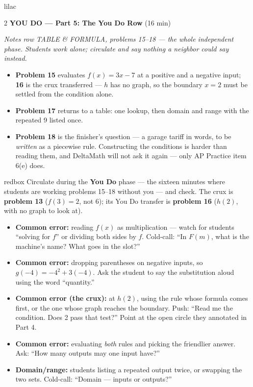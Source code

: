 \documentclass[10pt]{article}
\begin{document}
\begin{skillbox}{lilac}
\begin{multicols}{2}
\textbf{YOU DO --- Part 5: The You Do Row} (16 min)

\textit{Notes row TABLE \& FORMULA, problems 15--18 --- the whole independent
phase. Students work alone; circulate and say nothing a neighbor could say
instead.}
\begin{itemize}
  \item \textbf{Problem 15} evaluates $f(x) = 3x - 7$ at a positive and a negative
        input; \textbf{16} is the crux transferred --- $h$ has no graph, so the
        boundary $x = 2$ must be settled from the condition alone.
  \item \textbf{Problem 17} returns to a table: one lookup, then domain and range
        with the repeated 9 listed once.
  \item \textbf{Problem 18} is the finisher's question --- a garage tariff in
        words, to be \textit{written} as a piecewise rule. Constructing the
        conditions is harder than reading them, and DeltaMath will not ask it
        again --- only AP Practice item 6(e) does.
\end{itemize}
\end{multicols}
\end{skillbox}

\begin{skillbox}{redbox}
Circulate during the \textbf{You Do} phase --- the sixteen minutes where students
are working problems 15--18 without you --- and check. The crux is
\textbf{problem 13} ($f(3) = 2$, not 6); its You Do transfer is \textbf{problem
16} ($h(2)$, with no graph to look at).
\begin{itemize}
  \item \textbf{Common error:} reading $f(x)$ as multiplication --- watch for
        students ``solving for $f$'' or dividing both sides by $f$. Cold-call:
        ``In $F(m)$, what is the machine's name? What goes in the slot?''
  \item \textbf{Common error:} dropping parentheses on negative inputs, so
        $g(-4) = -4^2 + 3(-4)$. Ask the student to say the substitution aloud
        using the word ``quantity.''
  \item \textbf{Common error (the crux):} at $h(2)$, using the rule whose formula
        comes first, or the one whose graph reaches the boundary. Push: ``Read me
        the condition. Does 2 pass that test?'' Point at the open circle they
        annotated in Part 4.
  \item \textbf{Common error:} evaluating \emph{both} rules and picking the
        friendlier answer. Ask: ``How many outputs may one input have?''
  \item \textbf{Domain/range:} students listing a repeated output twice, or
        swapping the two sets. Cold-call: ``Domain --- inputs or outputs?''
\end{itemize}
\end{skillbox}
\end{document}
